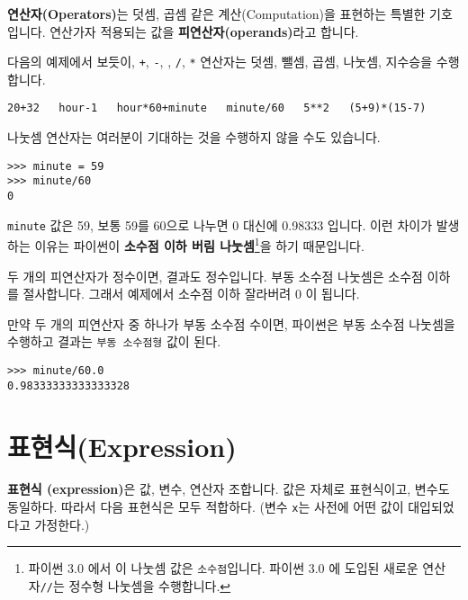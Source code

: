 
{\bf 연산자(Operators)}는 덧셈, 곱셈 같은 계산(Computation)을 표현하는 특별한 기호입니다. 연산가자 적용되는 값을 {\bf 피연산자(operands)}라고 합니다.

다음의 예제에서 보듯이, {\tt +}, {\tt -}, {\tt *}, {\tt /}, {\tt **} 연산자는 덧셈, 뺄셈, 곱셈, 나눗셈, 지수승을 수행합니다.

\beforeverb
\begin{verbatim}
20+32   hour-1   hour*60+minute   minute/60   5**2   (5+9)*(15-7)
\end{verbatim}
\afterverb
%
나눗셈 연산자는 여러분이 기대하는 것을 수행하지 않을 수도 있습니다.

\beforeverb
\begin{verbatim}
>>> minute = 59
>>> minute/60
0
\end{verbatim}
\afterverb
%

{\tt minute} 값은 59, 보통 59를 60으로 나누면 0 대신에 0.98333 입니다. 이런 차이가 발생하는 이유는 파이썬이 {\bf 소수점 이하 버림 나눗셈}\footnote{파이썬 3.0 에서 이 나눗셈 값은 {\tt 소수점}입니다. 파이썬 3.0 에 도입된 새로운 연산자{\tt //}는 정수형 나눗셈을 수행합니다.}을 하기 때문입니다.


두 개의 피연산자가 정수이면, 결과도 정수입니다. 부동 소수점 나눗셈은 소수점 이하를 절사합니다.
그래서 예제에서 소수점 이하 잘라버려 0 이 됩니다.

만약 두 개의 피연산자 중 하나가 부동 소수점 수이면, 파이썬은 부동 소수점 나눗셈을 수행하고 결과는 {\tt 부동 소수점형} 값이 된다.

\beforeverb
\begin{verbatim}
>>> minute/60.0
0.98333333333333328
\end{verbatim}
\afterverb

\section{표현식(Expression)}

{\bf 표현식 (expression)}은 값, 변수, 연산자 조합니다. 값은 자체로 표현식이고, 변수도 동일하다. 따라서 다음 표현식은 모두 적합하다. 
(변수 {\tt x}는 사전에 어떤 값이 대입되었다고 가정한다.)

